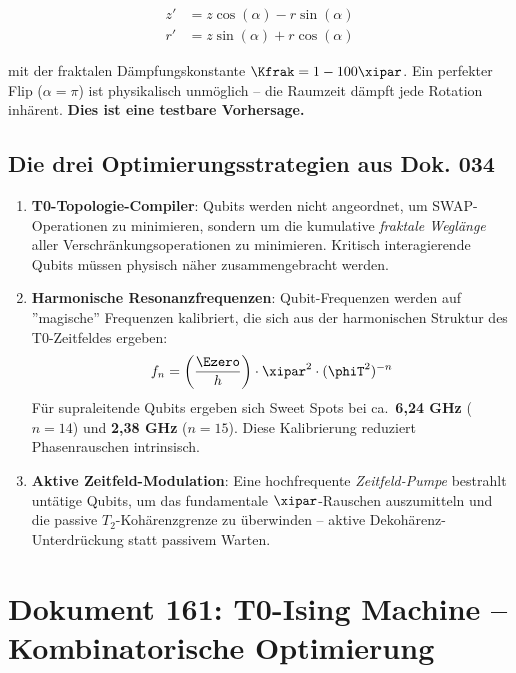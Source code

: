 \begin{align}
    z' &= z \cos(\alpha) - r \sin(\alpha) \\
    r' &= z \sin(\alpha) + r \cos(\alpha)
\end{align}

mit der fraktalen Dämpfungskonstante $\Kfrak = 1 - 100\xipar$.
Ein perfekter Flip ($\alpha = \pi$) ist physikalisch unmöglich -- die Raumzeit
dämpft jede Rotation inhärent. \textbf{Dies ist eine testbare Vorhersage.}

\subsection{Die drei Optimierungsstrategien aus Dok. 034}

\begin{enumerate}
    \item \textbf{T0-Topologie-Compiler}: Qubits werden nicht angeordnet, um SWAP-Operationen
    zu minimieren, sondern um die kumulative \emph{fraktale Weglänge} aller
    Verschränkungsoperationen zu minimieren. Kritisch interagierende Qubits müssen
    physisch näher zusammengebracht werden.

    \item \textbf{Harmonische Resonanzfrequenzen}: Qubit-Frequenzen werden auf
    ''magische'' Frequenzen kalibriert, die sich aus der harmonischen Struktur
    des T0-Zeitfeldes ergeben:
    \begin{equation}
        f_n = \left(\frac{\Ezero}{h}\right) \cdot \xipar^2 \cdot (\phiT^2)^{-n}
        \label{eq:harmonic_freq}
    \end{equation}
    Für supraleitende Qubits ergeben sich Sweet Spots bei ca.\ \textbf{6,24 GHz}
    ($n=14$) und \textbf{2,38 GHz} ($n=15$). Diese Kalibrierung reduziert
    Phasenrauschen intrinsisch.

    \item \textbf{Aktive Zeitfeld-Modulation}: Eine hochfrequente
    \emph{Zeitfeld-Pumpe} bestrahlt untätige Qubits, um das fundamentale
    $\xipar$-Rauschen auszumitteln und die passive $T_2$-Kohärenzgrenze zu
    überwinden -- aktive Dekohärenz-Unterdrückung statt passivem Warten.
\end{enumerate}

\clearpage

\section{Dokument 161: T0-Ising Machine -- Kombinatorische Optimierung}
\label{sec:doc161}

